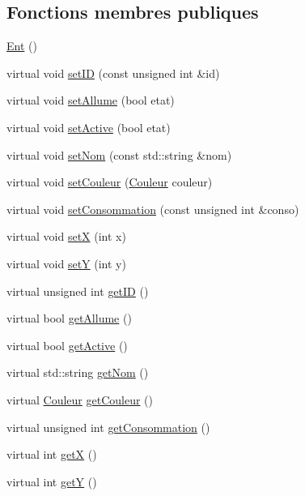 \subsection*{Fonctions membres publiques}
\begin{DoxyCompactItemize}
\item 
\hyperlink{classEclairage_1_1Ent_a2c185a5889bd49a541d9e1785b25322a}{Ent} ()
\item 
virtual void \hyperlink{classEclairage_1_1Ent_a927ff132e908bb3e68dab254f6c2ac2d}{set\+ID} (const unsigned int \&id)
\item 
virtual void \hyperlink{classEclairage_1_1Ent_a3c9d21bd3c725857050e39eb449d1ad5}{set\+Allume} (bool etat)
\item 
virtual void \hyperlink{classEclairage_1_1Ent_a1e9471a412f746a2284778c8d9548499}{set\+Active} (bool etat)
\item 
virtual void \hyperlink{classEclairage_1_1Ent_a348836d7b3c2f69f376d63c84ace8e3e}{set\+Nom} (const std\+::string \&nom)
\item 
virtual void \hyperlink{classEclairage_1_1Ent_a5f1a309d7e9c51a921a9ffcf8f6343f7}{set\+Couleur} (\hyperlink{Couleur_8h_aa304d0ca681f782b1d7735da33037dd7}{Couleur} couleur)
\item 
virtual void \hyperlink{classEclairage_1_1Ent_a64c03bcbe84186341b0d9f23e91cdfd8}{set\+Consommation} (const unsigned int \&conso)
\item 
virtual void \hyperlink{classEclairage_1_1Ent_a4c5528c086dee2b6c5433c6e103f7eeb}{setX} (int x)
\item 
virtual void \hyperlink{classEclairage_1_1Ent_abdf5e31d5b5788c832b964c3712b7231}{setY} (int y)
\item 
virtual unsigned int \hyperlink{classEclairage_1_1Ent_a503507f6dc76a84b54e22ef21d9f301d}{get\+ID} ()
\item 
virtual bool \hyperlink{classEclairage_1_1Ent_a6d968244e96edee75019717f95dbb1d2}{get\+Allume} ()
\item 
virtual bool \hyperlink{classEclairage_1_1Ent_a7fdf3efdeb7ec2f649a79a1681db6e1e}{get\+Active} ()
\item 
virtual std\+::string \hyperlink{classEclairage_1_1Ent_ae440f0f45ec8f6d11e54c1a0ebe8d5c1}{get\+Nom} ()
\item 
virtual \hyperlink{Couleur_8h_aa304d0ca681f782b1d7735da33037dd7}{Couleur} \hyperlink{classEclairage_1_1Ent_aaedbcf1b433035acb8470b0c4c50f826}{get\+Couleur} ()
\item 
virtual unsigned int \hyperlink{classEclairage_1_1Ent_afb847965b5bcccc415bb169e500656f9}{get\+Consommation} ()
\item 
virtual int \hyperlink{classEclairage_1_1Ent_a0b54632cd5ff1bcb588c4f8527361990}{getX} ()
\item 
virtual int \hyperlink{classEclairage_1_1Ent_a12a54fa5d966278eefc4b035142ade70}{getY} ()
\end{DoxyCompactItemize}


